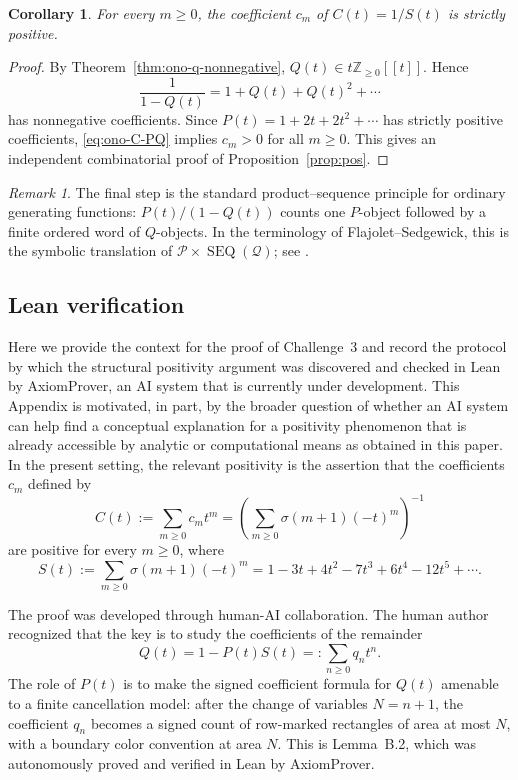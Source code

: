 \documentclass[11pt,reqno]{amsart}
\theoremstyle{plain}
\newtheorem{corollary}[theorem]{Corollary}
\theoremstyle{remark}
\newtheorem*{remark*}{Remark}
\theoremstyle{definition}
\numberwithin{equation}{section}
\newcommand{\auxftn}{P}
\newcommand{\auxprodftn}{Q}
\begin{document}
\begin{corollary}\label{cor:ono-c-positive}
For every $m\ge0$, the coefficient $c_m$ of $C(t)=
1/S(t)$ is strictly positive.
\end{corollary}

\begin{proof}
By Theorem~\ref{thm:ono-q-nonnegative}, $\auxprodftn (t)\in t\mathbb Z_{\ge0}[[t]]$. Hence
\[
  \frac1{1-\auxprodftn (t)}=1+\auxprodftn (t)+\auxprodftn (t)^2+\cdots
\]
has nonnegative coefficients. Since $\auxftn (t)=1+2t+2t^2+\cdots$ has strictly positive coefficients, \eqref{eq:ono-C-PQ} implies $c_m>0$ for all $m\ge0$.
This gives an independent combinatorial proof of Proposition~\ref{prop:pos}.
\end{proof}

\begin{remark*}
The final step is the standard product--sequence principle for ordinary generating functions: $\auxftn (t)/(1-\auxprodftn (t))$ counts one $\auxftn $-object followed by a finite ordered word of $\auxprodftn $-objects. In the terminology of Flajolet--Sedgewick, this is the symbolic translation of $\mathcal P\times\operatorname{SEQ}(\mathcal Q)$; see \cite[Chapter~I]{FS09}.
\end{remark*}
\subsection{Lean verification}\label{sec:AxiomProver}

Here we provide the context for the proof of Challenge~3 and record the protocol by which the
structural positivity argument was discovered and checked in Lean by AxiomProver, an AI system that is currently under development.  This Appendix is motivated, in
part, by the broader question of whether an AI system can help find a conceptual explanation for
a positivity phenomenon that is already accessible by analytic or computational means as obtained in this paper.  In the
present setting, the relevant positivity is the assertion that the coefficients $c_m$ defined by
\[
C(t):=  \sum_{m\geq 0} c_m t^m
  =
  \left(\sum_{m\geq 0}\sigma(m+1)(-t)^m\right)^{-1}
\]
are positive for every $m\geq 0$, where
\[
  S(t):=\sum_{m\ge 0}\sigma(m+1)(-t)^m
       =1-3t+4t^2-7t^3+6t^4-12t^5+\cdots .
\]




The proof was developed through human-AI collaboration. The human author recognized that the key is to study the coefficients of
the remainder 
$$Q(t)=1-P(t)S(t)=:\sum_{n\geq 0} q_n t^n.
$$
The role of $P(t)$ is to make the signed
coefficient formula for $Q(t)$ amenable to a finite cancellation model: after the change of
variables $N=n+1$, the coefficient $q_n$ becomes a signed count of row-marked rectangles of
area at most $N$, with a boundary color convention at area $N$. This is Lemma~B.2, which was autonomously proved and verified in Lean by AxiomProver.
\end{document}
